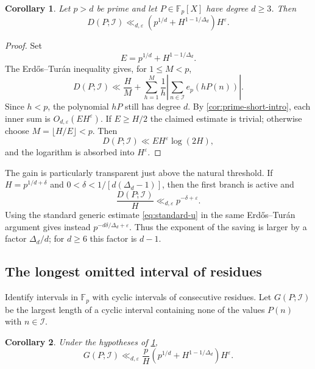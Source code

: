 \documentclass[11pt,reqno]{amsart}
\numberwithin{equation}{section}
\newtheorem{corollary}[corollary]{Corollary}
\theoremstyle{definition}
\theoremstyle{remark}
\begin{document}
\begin{corollary}\label{cor:discrepancy}
Let $p>d$ be prime and let $P\in\mathbb F_p[X]$ have degree $d\ge3$.  Then
\begin{equation}\label{eq:discrepancy-bound}
  D(P;\mathcal I)
  \ll_{d,\varepsilon}
  \left(p^{1/d}+H^{1-1/\Delta_d}\right)H^\varepsilon.
\end{equation}
\end{corollary}

\begin{proof}
Set
\[
  E=p^{1/d}+H^{1-1/\Delta_d}.
\]
The Erd\H{o}s--Tur\'an inequality \cite[Chapter~1]{Montgomery1994} gives, for $1\le M<p$,
\[
  D(P;\mathcal I)
  \ll\frac HM+
  \sum_{h=1}^{M}\frac1h
  \left|\sum_{n\in\mathcal I}e_p(hP(n))\right|.
\]
Since $h<p$, the polynomial $hP$ still has degree $d$.  By \cref{cor:prime-short-intro}, each inner sum is
$O_{d,\varepsilon}(EH^\varepsilon)$.  If $E\ge H/2$ the claimed estimate is trivial; otherwise choose $M=\lfloor H/E\rfloor<p$.  Then
\[
  D(P;\mathcal I)\ll EH^\varepsilon\log(2H),
\]
and the logarithm is absorbed into $H^\varepsilon$.
\end{proof}

The gain is particularly transparent just above the natural threshold.  If
$H=p^{1/d+\delta}$ and
$0<\delta<1/[d(\Delta_d-1)]$, then the first branch is active and
\begin{equation}\label{eq:normalized-discrepancy-first-branch}
  \frac{D(P;\mathcal I)}H
  \ll_{d,\varepsilon}p^{-\delta+\varepsilon}.
\end{equation}
Using the standard generic estimate \eqref{eq:standard-u} in the same
Erd\H{o}s--Tur\'an argument gives instead
$p^{-d\delta/\Delta_d+\varepsilon}$.  Thus the exponent of the saving is
larger by a factor $\Delta_d/d$; for $d\ge6$ this factor is $d-1$.

\subsection{The longest omitted interval of residues}

Identify intervals in $\mathbb F_p$ with cyclic intervals of consecutive residues.  Let $G(P;\mathcal I)$ be the largest length of a cyclic interval containing none of the values $P(n)$ with $n\in\mathcal I$.

\begin{corollary}\label{cor:gaps}
Under the hypotheses of \cref{cor:discrepancy},
\begin{equation}\label{eq:gap-bound}
  G(P;\mathcal I)
  \ll_{d,\varepsilon}
  \frac pH
  \left(p^{1/d}+H^{1-1/\Delta_d}\right)H^\varepsilon.
\end{equation}
\end{corollary}
\end{document}
